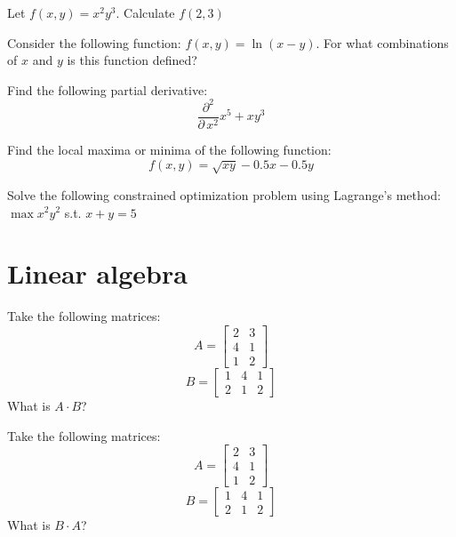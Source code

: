 \documentclass[10pt]{article}
\newenvironment{problem}[2][Problem]{\begin{trivlist}
\item[\hskip \labelsep {\bfseries #1}\hskip \labelsep {\bfseries #2.}]}{\end{trivlist}}
\begin{document}
\begin{problem}{3.8}
Let $f(x,y)=x^2y^3$. Calculate $f(2,3)$
\end{problem}

\begin{problem}{3.9}
Consider the following function: $f(x,y)=\ln(x-y)$. For what combinations of $x$ and $y$ is this function defined?
\end{problem}

\begin{problem}{3.10}
Find the following partial derivative:
$$\frac{\partial^2}{\partial \, x^2} x^5+xy^3$$
\end{problem}

\begin{problem}{3.11}
Find the local maxima or minima of the following function:
$$f(x,y)=\sqrt{xy}-0.5x-0.5y$$
\end{problem}

\begin{problem}{3.12}
Solve the following constrained optimization problem using Lagrange's method:
$\max x^2y^2$ s.t. $x+y=5$
\end{problem}

\section{Linear algebra}

\begin{problem}{4.1}
Take the following matrices:
$$A=\begin{bmatrix} 2 & 3\\ 4 & 1 \\ 1 & 2\end{bmatrix}$$
$$B=\begin{bmatrix} 1 & 4 & 1\\2 & 1 & 2\end{bmatrix}$$
What is $A \cdot B$?
\end{problem}

\begin{problem}{4.2}
Take the following matrices:
$$A=\begin{bmatrix} 2 & 3\\ 4 & 1 \\ 1 & 2\end{bmatrix}$$
$$B=\begin{bmatrix} 1 & 4 & 1\\2 & 1 & 2\end{bmatrix}$$
What is $B \cdot A$?
\end{problem}
\end{document}
